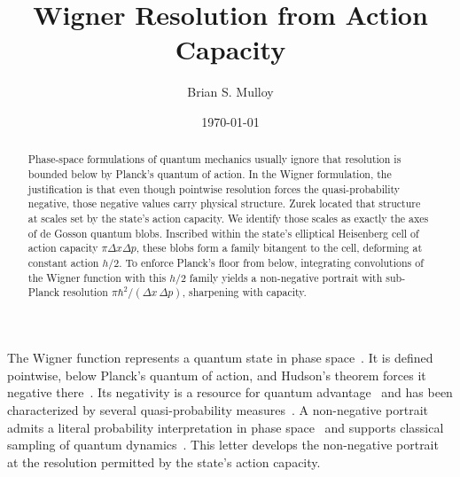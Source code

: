 \documentclass[aps,prl,reprint,amsmath,amssymb,floatfix,nofootinbib]{revtex4-2}
\begin{document}
\title{Wigner Resolution from Action Capacity}

\author{Brian S. Mulloy}

\date{\today}

\begin{abstract}
Phase-space formulations of quantum mechanics usually ignore that resolution is bounded below by Planck's quantum of action. In the Wigner formulation, the justification is that even though pointwise resolution forces the quasi-probability negative, those negative values carry physical structure. Zurek located that structure at scales set by the state's action capacity. We identify those scales as exactly the axes of de Gosson quantum blobs. Inscribed within the state's elliptical Heisenberg cell of action capacity $\pi \Delta x \Delta p$, these blobs form a family bitangent to the cell, deforming at constant action $h/2$. To enforce Planck's floor from below, integrating convolutions of the Wigner function with this $h/2$ family yields a non-negative portrait with sub-Planck resolution $\pi\hbar^2/(\Delta x\,\Delta p)$, sharpening with capacity.
\end{abstract}


\maketitle

The Wigner function represents a quantum state in phase space~\cite{wigner1932,hillery1984}. It is defined pointwise, below Planck's quantum of action, and Hudson's theorem forces it negative there~\cite{hudson1974}. Its negativity is a resource for quantum advantage~\cite{veitch2012,marieisert2012} and has been characterized by several quasi-probability measures~\cite{kenfack2004}. A non-negative portrait admits a literal probability interpretation in phase space~\cite{husimi1940,cartwright1976,degosson2005bullsci} and supports classical sampling of quantum dynamics~\cite{polkovnikov2010}. This letter develops the non-negative portrait at the resolution permitted by the state's action capacity.
\end{document}
